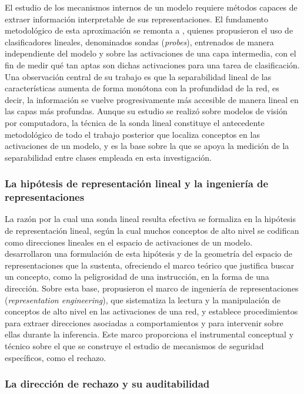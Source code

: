 \documentclass[12pt,a4paper]{article}
\newcommand{\textcite}[1]{\citet{#1}}
\begin{document}
El estudio de los mecanismos internos de un modelo requiere métodos capaces de extraer información interpretable de sus representaciones. El fundamento metodológico de esta aproximación se remonta a \textcite{alain2017}, quienes propusieron el uso de clasificadores lineales, denominados sondas (\textit{probes}), entrenados de manera independiente del modelo y sobre las activaciones de una capa intermedia, con el fin de medir qué tan aptas son dichas activaciones para una tarea de clasificación. Una observación central de su trabajo es que la separabilidad lineal de las características aumenta de forma monótona con la profundidad de la red, es decir, la información se vuelve progresivamente más accesible de manera lineal en las capas más profundas. Aunque su estudio se realizó sobre modelos de visión por computadora, la técnica de la sonda lineal constituye el antecedente metodológico de todo el trabajo posterior que localiza conceptos en las activaciones de un modelo, y es la base sobre la que se apoya la medición de la separabilidad entre clases empleada en esta investigación.

\subsubsection*{La hipótesis de representación lineal y la ingeniería de representaciones}

\justifying

La razón por la cual una sonda lineal resulta efectiva se formaliza en la hipótesis de representación lineal, según la cual muchos conceptos de alto nivel se codifican como direcciones lineales en el espacio de activaciones de un modelo. \textcite{park2024} desarrollaron una formulación de esta hipótesis y de la geometría del espacio de representaciones que la sustenta, ofreciendo el marco teórico que justifica buscar un concepto, como la peligrosidad de una instrucción, en la forma de una dirección. Sobre esta base, \textcite{zou2023} propusieron el marco de ingeniería de representaciones (\textit{representation engineering}), que sistematiza la lectura y la manipulación de conceptos de alto nivel en las activaciones de una red, y establece procedimientos para extraer direcciones asociadas a comportamientos y para intervenir sobre ellas durante la inferencia. Este marco proporciona el instrumental conceptual y técnico sobre el que se construye el estudio de mecanismos de seguridad específicos, como el rechazo.

\subsubsection*{La dirección de rechazo y su auditabilidad}
\end{document}
